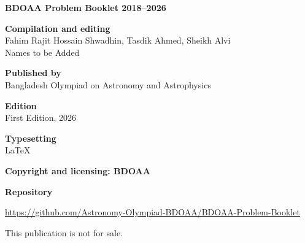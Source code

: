 \documentclass[10pt,a5paper,twoside]{article}
\begin{document}
	
	\begin{flushleft}
		
		\small
		
		\textbf{BDOAA Problem Booklet 2018--2026}
		
		\vspace{0.35cm}
		
		\textbf{Compilation and editing}\\
		Fahim Rajit Hossain Shwadhin, Tasdik Ahmed, Sheikh Alvi\\
		Names to be Added
		
		\vspace{0.35cm}
		
		\textbf{Published by}\\
		Bangladesh Olympiad on Astronomy
		and Astrophysics
		
		\vspace{0.35cm}
		
		\textbf{Edition}\\
		First Edition, 2026
		
		\vspace{0.35cm}
		
		\textbf{Typesetting}\\
		\LaTeX
		
		\vspace{0.35cm}
		
		\textbf{Copyright and licensing: BDOAA}
		
		\vspace{0.35cm}
		
		\textbf{Repository}
		
		{\footnotesize
			\url{https://github.com/Astronomy-Olympiad-BDOAA/BDOAA-Problem-Booklet}
			\par}
		
		\vspace{0.35cm}
		
		This publication is not for sale.
		
	\end{flushleft}
	
	\clearpage




\clearpage
\pagestyle{empty}

\end{document}
